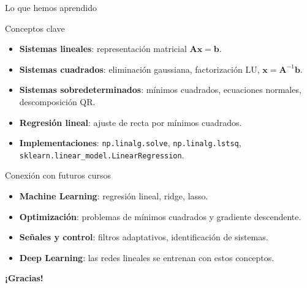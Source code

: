 \documentclass[aspectratio=169, 10pt, xcolor=table]{beamer}
\begin{document}
\begin{frame}{Lo que hemos aprendido}
    \begin{exampleblock}{Conceptos clave}
        \begin{itemize}
            \item \textbf{Sistemas lineales}: representación matricial $\mathbf{A}\mathbf{x}=\mathbf{b}$.
            \item \textbf{Sistemas cuadrados}: eliminación gaussiana, factorización LU, $\mathbf{x}=\mathbf{A}^{-1}\mathbf{b}$.
            \item \textbf{Sistemas sobredeterminados}: mínimos cuadrados, ecuaciones normales, descomposición QR.
            \item \textbf{Regresión lineal}: ajuste de recta por mínimos cuadrados.
            \item \textbf{Implementaciones}: \texttt{np.linalg.solve}, \texttt{np.linalg.lstsq}, \texttt{sklearn.linear\_model.LinearRegression}.
        \end{itemize}
    \end{exampleblock}
\end{frame}

\begin{frame}{Conexión con futuros cursos}
    \begin{itemize}
        \item \textbf{Machine Learning}: regresión lineal, ridge, lasso.
        \item \textbf{Optimización}: problemas de mínimos cuadrados y gradiente descendente.
        \item \textbf{Señales y control}: filtros adaptativos, identificación de sistemas.
        \item \textbf{Deep Learning}: las redes lineales se entrenan con estos conceptos.
    \end{itemize}
\end{frame}

\begin{frame}
    \centering
    \Huge \textbf{¡Gracias!}

\end{frame}
\end{document}
